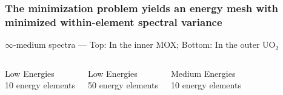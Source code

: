\documentclass[compress,10pt]{beamer}
\begin{document}
\begin{frame}
    \frametitle{The minimization problem yields an energy mesh with minimized within-element spectral variance}

    \centering

    \vspace{-4mm}
    {\small $\infty$-medium spectra --- Top: In the inner MOX; Bottom: In the outer UO$_2$ } \\

    \begin{columns}[t]

        \centering

        {\footnotesize Low Energies\\ 10 energy elements}

        \centering

        {\footnotesize Low Energies\\ 50 energy elements}

        \centering

        {\footnotesize Medium Energies\\ 10 energy elements}

    \end{columns}

    \begin{columns}[t]

        \centering


        \centering


        \centering


    \end{columns}

     \begin{columns}[t]

        \centering


        \centering


        \centering


    \end{columns}

\end{frame}
\end{document}
